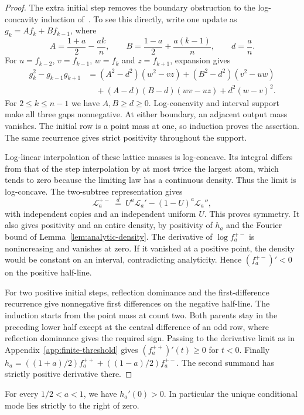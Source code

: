 \begin{proof}
The extra initial step removes the boundary obstruction to the
log-concavity induction of~\cite[Proposition~2.2]{glrs2025}.
To see this directly, write one update as $g_k=Af_k+Bf_{k-1}$, where
\[
 A=\frac{1+a}{2}-\frac{ak}{n},\qquad
 B=\frac{1-a}{2}+\frac{a(k-1)}n,\qquad d=\frac an.
\]
For $u=f_{k-2}$, $v=f_{k-1}$, $w=f_k$ and $z=f_{k+1}$, expansion gives
\begin{align*}
 g_k^2-g_{k-1}g_{k+1}
 &=(A^2-d^2)(w^2-vz)+(B^2-d^2)(v^2-uw)\\
 &\quad +(A-d)(B-d)(wv-uz)+d^2(w-v)^2.
\end{align*}
For $2\le k\le n-1$ we have $A,B\ge d\ge0$.
Log-concavity and interval support make all three gaps nonnegative.
At either boundary, an adjacent output mass vanishes. The initial
row is a point mass at one, so induction proves the assertion.
The same recurrence gives strict positivity throughout the support.

Log-linear interpolation of these lattice masses is log-concave.
Its integral differs from that of the step interpolation by at most
twice the largest atom, which tends to zero because the limiting law
has a continuous density. Thus the limit is log-concave.
The two-subtree representation gives
\[
 \mathcal L_a^{+-}\ \stackrel d=\ U^a\mathcal L_a'-(1-U)^a\mathcal L_a'',
\]
with independent copies and an independent uniform $U$.
This proves symmetry. It also gives positivity and an entire density,
by positivity of $h_a$ and the Fourier bound of
Lemma~\ref{lem:analytic-density}. The derivative of $\log f_a^{+-}$
is nonincreasing and vanishes at zero. If it vanished at a positive
point, the density would be constant on an interval, contradicting
analyticity. Hence $(f_a^{+-})'<0$ on the positive half-line.

For two positive initial steps, reflection dominance and the
first-difference recurrence give nonnegative first differences on
the negative half-line. The induction starts from the point mass
at count two. Both parents stay in the preceding lower half except
at the central difference of an odd row, where reflection dominance
gives the required sign. Passing to the derivative limit as in
Appendix~\ref{app:finite-threshold} gives $(f_a^{++})'(t)\ge0$ for $t<0$.
Finally
$h_a=((1+a)/2)f_a^{++}+((1-a)/2)f_a^{+-}$.
The second summand has strictly positive derivative there.
\end{proof}

\begin{lemma}\label{lem:positive-conditional-mode}
For every $1/2<a<1$, we have $h_a'(0)>0$. In particular the unique
conditional mode lies strictly to the right of zero.
\end{lemma}


